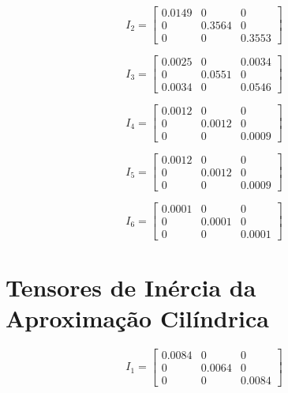 \begin{equation}
I_{2} = 
\begin{bmatrix}
0.0149 & 0 & 0\\
0 & 0.3564 & 0\\
0 & 0 & 0.3553
\end{bmatrix}
\end{equation}

\begin{equation}
I_{3} = 
\begin{bmatrix}
0.0025 & 0 & 0.0034\\
0 & 0.0551 & 0\\
0.0034 & 0 & 0.0546
\end{bmatrix}
\end{equation}

\begin{equation}
I_{4} = 
\begin{bmatrix}
0.0012 & 0 & 0\\
0 & 0.0012 & 0\\
0 & 0 & 0.0009
\end{bmatrix}
\end{equation}

\begin{equation}
I_{5} = 
\begin{bmatrix}
0.0012 & 0 & 0\\
0 & 0.0012 & 0\\
0 & 0 & 0.0009
\end{bmatrix}
\end{equation}

\begin{equation}
I_{6} = 
\begin{bmatrix}
0.0001 & 0 & 0\\
0 & 0.0001 & 0\\
0 & 0 & 0.0001
\end{bmatrix}
\end{equation}

\section{Tensores de Inércia da Aproximação Cilíndrica}

\begin{equation}
I_{1} = 
\begin{bmatrix}
0.0084 & 0 & 0\\
0 & 0.0064 & 0\\
0 & 0 & 0.0084
\end{bmatrix}
\end{equation}

